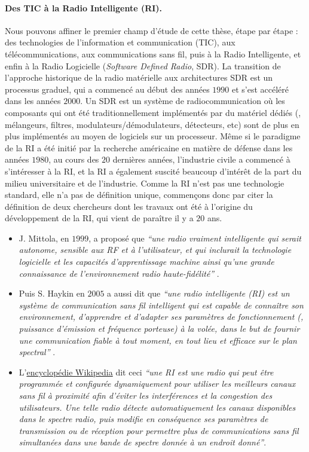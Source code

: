 \begin{resume_fr}
\paragraph{Des TIC à la Radio Intelligente (RI).}
%
Nous pouvons affiner le premier champ d'étude de cette thèse, étape par étape :
des technologies de l'information et communication (TIC), aux télécommunications, aux communications sans fil, puis à la Radio Intelligente,
et enfin à la Radio Logicielle (\emph{Software Defined Radio}, SDR).
%
La transition de l'approche historique de la radio matérielle aux architectures SDR est un processus graduel, qui a commencé au début des années $1990$ et s'est accéléré dans les années $2000$.
Un SDR est un système de radiocommunication où les composants qui ont été traditionnellement implémentés par du matériel dédiés (\eg, mélangeurs, filtres, modulateurs/démodulateurs, détecteurs, etc) sont de plus en plus implémentés au moyen de logiciels sur un processeur.
%
Même si le paradigme de la RI a été initié par la recherche américaine en matière de défense dans les années $1980$, au cours des $20$ dernières années, l'industrie civile a commencé à s'intéresser à la RI, et la RI a également suscité beaucoup d'intérêt de la part du milieu universitaire et de l'industrie.
%
Comme la RI n'est pas une technologie standard, elle n'a pas de définition unique, commençons donc par citer la définition de deux chercheurs dont les travaux ont été à l'origine du développement de la RI, qui vient de paraître il y a $20$ ans.
%
\begin{itemize}\tightlist
    \item
    J. Mittola, en $1999$, a proposé que
    \emph{``une radio vraiment intelligente qui serait autonome, sensible aux RF et à l'utilisateur, et qui inclurait la technologie logicielle et les capacités d'apprentissage machine ainsi qu'une grande connaissance de l'environnement radio haute-fidélité''} \cite{Mitola99}.

    \item
    Puis S. Haykin en $2005$ a aussi dit que
    \emph{``une radio intelligente (RI) est un système de communication sans fil intelligent qui est capable de connaître son environnement, d'apprendre et d'adapter ses paramètres de fonctionnement (\eg, puissance d'émission et fréquence porteuse) à la volée, dans le but de fournir une communication fiable à tout moment, en tout lieu et efficace sur le plan spectral''} \cite{Haykin05}.

    \item
    L'\href{https://en.wikipedia.org/wiki/Cognitive_radio}{encyclopédie Wikipedia} dit ceci
    \emph{``une RI est une radio qui peut être programmée et configurée dynamiquement pour utiliser les meilleurs canaux sans fil à proximité afin d'éviter les interférences et la congestion des utilisateurs. Une telle radio détecte automatiquement les canaux disponibles dans le spectre radio, puis modifie en conséquence ses paramètres de transmission ou de réception pour permettre plus de communications sans fil simultanées dans une bande de spectre donnée à un endroit donné''}.
\end{itemize}


\end{resume_fr}
